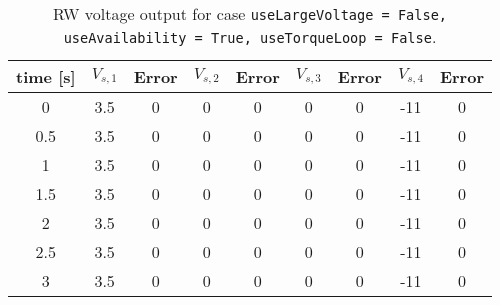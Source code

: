 \begin{table}[htbp]\caption{RW voltage output for case {\tt useLargeVoltage = False, useAvailability = True, useTorqueLoop = False}.}\label{tbl:testFalseTrueFalse}\centering\begin{tabular}{ccccccccc}
\hline
  time [s]  &  $V_{s,1}$  &  Error  &  $V_{s,2}$  &  Error  &  $V_{s,3}$  &  Error  &  $V_{s,4}$  &  Error  \\
\hline
     0      &     3.5     &    0    &      0      &    0    &      0      &    0    &     -11     &    0    \\
    0.5     &     3.5     &    0    &      0      &    0    &      0      &    0    &     -11     &    0    \\
     1      &     3.5     &    0    &      0      &    0    &      0      &    0    &     -11     &    0    \\
    1.5     &     3.5     &    0    &      0      &    0    &      0      &    0    &     -11     &    0    \\
     2      &     3.5     &    0    &      0      &    0    &      0      &    0    &     -11     &    0    \\
    2.5     &     3.5     &    0    &      0      &    0    &      0      &    0    &     -11     &    0    \\
     3      &     3.5     &    0    &      0      &    0    &      0      &    0    &     -11     &    0    \\
\hline\end{tabular}\end{table}